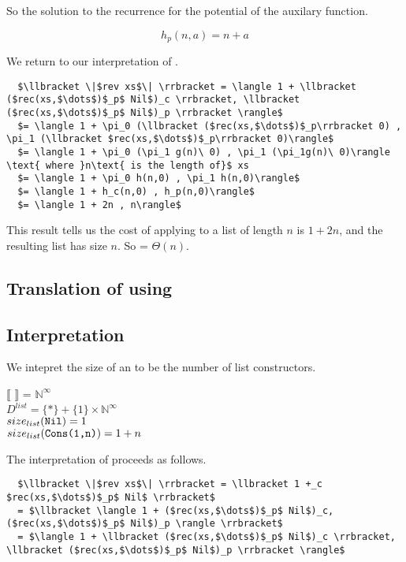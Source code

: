 So the solution to the recurrence for the potential of the auxilary function.
\begin{framed}
  \[h_p(n,a) = n + a \]
\end{framed}


We return to our interpretation of .
\begin{lstlisting}
  $\llbracket \|$rev xs$\| \rrbracket = \langle 1 + \llbracket ($rec(xs,$\dots$)$_p$ Nil$)_c \rrbracket, \llbracket ($rec(xs,$\dots$)$_p$ Nil$)_p \rrbracket \rangle$
  $= \langle 1 + \pi_0 (\llbracket ($rec(xs,$\dots$)$_p\rrbracket 0) , \pi_1 (\llbracket $rec(xs,$\dots$)$_p\rrbracket 0)\rangle$
  $= \langle 1 + \pi_0 (\pi_1 g(n)\ 0) , \pi_1 (\pi_1g(n)\ 0)\rangle \text{ where }n\text{ is the length of}$ xs
  $= \langle 1 + \pi_0 h(n,0) , \pi_1 h(n,0)\rangle$
  $= \langle 1 + h_c(n,0) , h_p(n,0)\rangle$
  $= \langle 1 + 2n , n\rangle$
\end{lstlisting}

This result tells us the cost of applying  to a list  of length $n$ is $1+2n$, and the resulting list has size $n$.
So  = $\Theta(n)$.




\subsection*{Translation of  using }

\subsection*{Interpretation}

We intepret the size of an  to be the number of list constructors.
\begin{framed}
$\llbracket$  $\rrbracket$ = $\mathbb{N}^\infty$\\
$D^{list} = \{\ast\} + \{1\} \times \mathbb{N}^\infty$\\
$size_{list}(\texttt{Nil}) = 1$\\
$size_{list}(\texttt{Cons(1,n)}) = 1 + n$\\
\end{framed}

The interpretation of  proceeds as follows.
\begin{lstlisting}
  $\llbracket \|$rev xs$\| \rrbracket = \llbracket 1 +_c $rec(xs,$\dots$)$_p$ Nil$ \rrbracket$
  = $\llbracket \langle 1 + ($rec(xs,$\dots$)$_p$ Nil$)_c, ($rec(xs,$\dots$)$_p$ Nil$)_p \rangle \rrbracket$
  = $\langle 1 + \llbracket ($rec(xs,$\dots$)$_p$ Nil$)_c \rrbracket, \llbracket ($rec(xs,$\dots$)$_p$ Nil$)_p \rrbracket \rangle$
\end{lstlisting}

